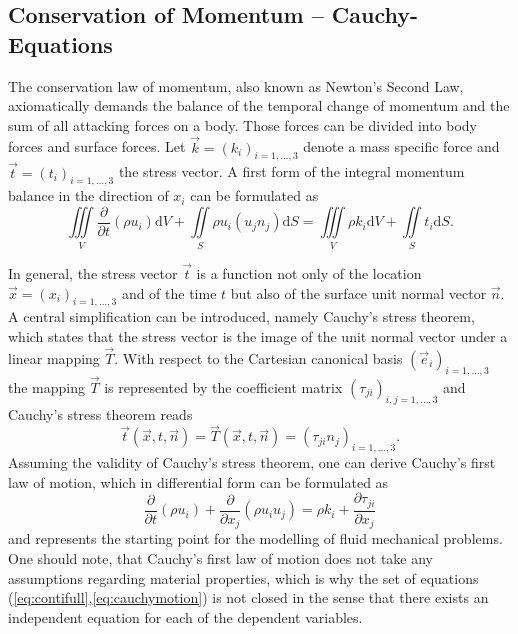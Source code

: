 \subsection{Conservation of Momentum -- Cauchy-Equations}

The conservation law of momentum, also known as Newton's Second Law, axiomatically demands the balance of the temporal change of momentum and the sum of all attacking forces on a body. Those forces can be divided into body forces and surface forces. Let \(\vec{k} = \left( k_i \right)_{i=1,\dots,3}\) denote a mass specific force and \(\vec{t} = \left(t_i\right)_{i=1,\dots,3}\) the stress vector. A first form of the integral momentum balance in the direction of \(x_i\) can be formulated as
\begin{equation}
\label{eq:cauchy}
\iiint\limits_V \frac{\partial }{\partial t}\left(\rho u_i \right) \mathrm{d}V + \iint\limits_S \rho u_i \left( u_j n_j \right) \mathrm{d}S = \iiint\limits_V \rho k_i \mathrm{d}V + \iint\limits_S t_i \mathrm{d}S.
\end{equation}

In general, the stress vector \(\vec{t}\) is a function not only of the location \(\vec{x} = \left( x_i \right)_{i = 1,\dots,3}\) and of the time \(t\) but also of the surface unit normal vector \(\vec{n}\). A central simplification can be introduced, namely Cauchy's stress theorem, which states that the stress vector is the image of the unit normal vector under a linear mapping \(\vec{T}\). With respect to the Cartesian canonical basis \(\left(\vec{e}_i \right)_{i = 1, \dots, 3}\) the mapping \(\vec{T}\) is represented by the coefficient matrix \( \left(\tau_{ji}\right)_{i,j = 1,\dots,3}\) and Cauchy's stress theorem reads
\begin{displaymath}
  \vec{t}\left(\vec{x},t,\vec{n}\right) = \vec{T}(\vec{x},t,\vec{n}) = \left(\tau_{ji} n_j\right)_{i = 1, \dots, 3}.
\end{displaymath}
Assuming the validity of Cauchy's stress theorem, one can derive Cauchy's first law of motion, which in differential form can be formulated as
\begin{equation}
  \label{eq:cauchymotion}
  \frac{\partial }{\partial t} \left(\rho u_i \right)
  + \frac{\partial}{\partial x_j}\left( \rho u_i u_j \right) 
  = \rho k_i + \frac{\partial \tau_{ji}}{\partial x_j}
\end{equation}
and represents the starting point for the modelling of fluid mechanical problems. One should note, that Cauchy's first law of motion does not take any assumptions regarding material properties, which is why the set of equations (\ref{eq:contifull},\ref{eq:cauchymotion}) is not closed in the sense that there exists an independent equation for each of the dependent variables.

